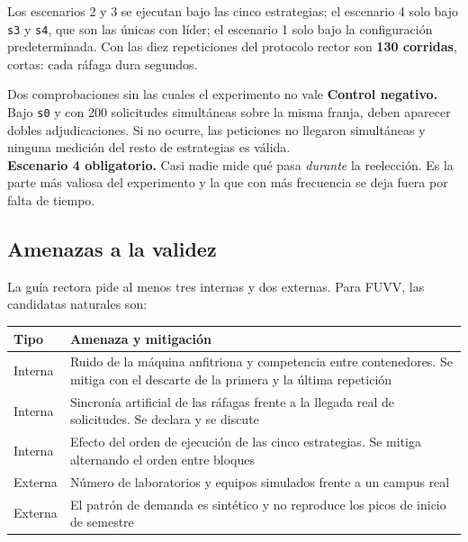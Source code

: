 \documentclass[11pt,a4paper]{article}
\begin{document}
Los escenarios 2 y 3 se ejecutan bajo las cinco estrategias; el escenario 4 solo bajo \texttt{s3} y \texttt{s4}, que son las únicas con líder; el escenario 1 solo bajo la configuración predeterminada. Con las diez repeticiones del protocolo rector son \textbf{130 corridas}, cortas: cada ráfaga dura segundos.

\begin{pisoBox}{Dos comprobaciones sin las cuales el experimento no vale}
	\textbf{Control negativo.} Bajo \texttt{s0} y con 200 solicitudes simultáneas sobre la misma franja, deben aparecer dobles adjudicaciones. Si no ocurre, las peticiones no llegaron simultáneas y ninguna medición del resto de estrategias es válida.\\[5pt]
	\textbf{Escenario 4 obligatorio.} Casi nadie mide qué pasa \emph{durante} la reelección. Es la parte más valiosa del experimento y la que con más frecuencia se deja fuera por falta de tiempo.
\end{pisoBox}

\subsection{Amenazas a la validez}

La guía rectora pide al menos tres internas y dos externas. Para FUVV, las candidatas naturales son:

\begin{center}
	\small
	\begin{tabular}{@{}p{2.0cm}p{12.9cm}@{}}
		\toprule
		\textbf{Tipo} & \textbf{Amenaza y mitigación} \\
		\midrule
		Interna & Ruido de la máquina anfitriona y competencia entre contenedores. Se mitiga con el descarte de la primera y la última repetición \\
		Interna & Sincronía artificial de las ráfagas frente a la llegada real de solicitudes. Se declara y se discute \\
		Interna & Efecto del orden de ejecución de las cinco estrategias. Se mitiga alternando el orden entre bloques \\
		\addlinespace
		Externa & Número de laboratorios y equipos simulados frente a un campus real \\
		Externa & El patrón de demanda es sintético y no reproduce los picos de inicio de semestre \\
		\bottomrule
	\end{tabular}
\end{center}
\end{document}
